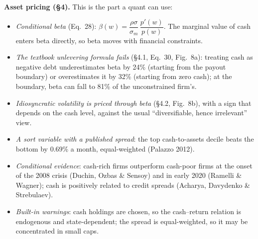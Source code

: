 \documentclass[11pt,a4paper]{article}
\begin{document}
\medskip\noindent\textbf{Asset pricing (§4).} This is the part a quant can use:
\begin{itemize}[leftmargin=1.4em]
  \item \emph{Conditional beta} (Eq.~28): $\beta(w)=\dfrac{\rho\sigma}{\sigma_m}\,\dfrac{p'(w)}{p(w)}$.
        The marginal value of cash enters beta directly, so beta moves with financial constraints.
  \item \emph{The textbook unlevering formula fails} (§4.1, Eq.~30, Fig.~8a): treating cash as negative
        debt underestimates beta by 24\% (starting from the payout boundary) or overestimates it by
        32\% (starting from zero cash); at the boundary, beta can fall to 81\% of the unconstrained
        firm's.
  \item \emph{Idiosyncratic volatility is priced through beta} (§4.2, Fig.~8b), with a sign that depends
        on the cash level, against the usual ``diversifiable, hence irrelevant'' view.
  \item \emph{A sort variable with a published spread}: the top cash-to-assets decile beats the bottom by
        0.69\% a month, equal-weighted (Palazzo 2012).
  \item \emph{Conditional evidence}: cash-rich firms outperform cash-poor firms at the onset of the 2008
        crisis (Duchin, Ozbas \& Sensoy) and in early 2020 (Ramelli \& Wagner); cash is positively related
        to credit spreads (Acharya, Davydenko \& Strebulaev).
  \item \emph{Built-in warnings}: cash holdings are chosen, so the cash--return relation is endogenous and
        state-dependent; the spread is equal-weighted, so it may be concentrated in small caps.
\end{itemize}
\end{document}
